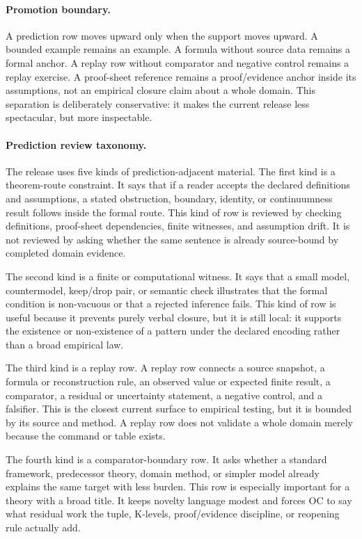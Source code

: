 \paragraph{Promotion boundary.}
A prediction row moves upward only when the support moves upward. A bounded
example remains an example. A formula without source data remains a formal
anchor. A replay row without comparator and negative control remains a replay
exercise. A proof-sheet reference remains a proof/evidence anchor inside its
assumptions, not an empirical closure claim about a whole domain. This
separation is deliberately conservative: it makes the current release less
spectacular, but more inspectable.

\paragraph{Prediction review taxonomy.}
The release uses five kinds of prediction-adjacent material. The first kind is
a theorem-route constraint. It says that if a reader accepts the declared
definitions and assumptions, a stated obstruction, boundary, identity, or
continuumness result follows inside the formal route. This kind of row is
reviewed by checking definitions, proof-sheet dependencies, finite witnesses,
and assumption drift. It is not reviewed by asking whether the same sentence is
already source-bound by completed domain evidence.

The second kind is a finite or computational witness. It says that a small
model, countermodel, keep/drop pair, or semantic check illustrates that the
formal condition is non-vacuous or that a rejected inference fails. This kind of
row is useful because it prevents purely verbal closure, but it is still local:
it supports the existence or non-existence of a pattern under the declared
encoding rather than a broad empirical law.

The third kind is a replay row. A replay row connects a source snapshot, a
formula or reconstruction rule, an observed value or expected finite result, a
comparator, a residual or uncertainty statement, a negative control, and a
falsifier. This is the closest current surface to empirical testing, but it is
bounded by its source and method. A replay row does not validate a whole domain
merely because the command or table exists.

The fourth kind is a comparator-boundary row. It asks whether a standard
framework, predecessor theory, domain method, or simpler model already explains
the same target with less burden. This row is especially important for a theory
with a broad title. It keeps novelty language modest and forces OC to say what
residual work the tuple, K-levels, proof/evidence discipline, or reopening rule
actually add.

